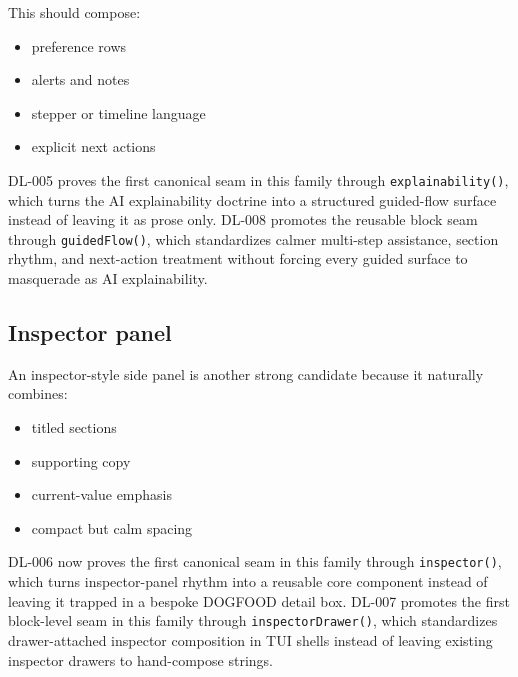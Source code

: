 This should compose:

\begin{itemize}
\tightlist
\item
  preference rows
\item
  alerts and notes
\item
  stepper or timeline language
\item
  explicit next actions
\end{itemize}

DL-005 proves the first canonical seam in this family through \texttt{e\allowbreak{}x\allowbreak{}p\allowbreak{}l\allowbreak{}a\allowbreak{}i\allowbreak{}n\allowbreak{}a\allowbreak{}b\allowbreak{}i\allowbreak{}l\allowbreak{}i\allowbreak{}t\allowbreak{}y\allowbreak{}(\allowbreak{})}, which turns the AI explainability doctrine into a structured guided-flow surface instead of leaving it as prose only. DL-008 promotes the reusable block seam through \texttt{g\allowbreak{}u\allowbreak{}i\allowbreak{}d\allowbreak{}e\allowbreak{}d\allowbreak{}F\allowbreak{}l\allowbreak{}o\allowbreak{}w\allowbreak{}(\allowbreak{})}, which standardizes calmer multi-step assistance, section rhythm, and next-action treatment without forcing every guided surface to masquerade as AI explainability.

\subsection{Inspector panel}\label{record-018-inspector-panel}

An inspector-style side panel is another strong candidate because it naturally combines:

\begin{itemize}
\tightlist
\item
  titled sections
\item
  supporting copy
\item
  current-value emphasis
\item
  compact but calm spacing
\end{itemize}

DL-006 now proves the first canonical seam in this family through \texttt{i\allowbreak{}n\allowbreak{}s\allowbreak{}p\allowbreak{}e\allowbreak{}c\allowbreak{}t\allowbreak{}o\allowbreak{}r\allowbreak{}(\allowbreak{})}, which turns inspector-panel rhythm into a reusable core component instead of leaving it trapped in a bespoke DOGFOOD detail box. DL-007 promotes the first block-level seam in this family through \texttt{i\allowbreak{}n\allowbreak{}s\allowbreak{}p\allowbreak{}e\allowbreak{}c\allowbreak{}t\allowbreak{}o\allowbreak{}r\allowbreak{}D\allowbreak{}r\allowbreak{}a\allowbreak{}w\allowbreak{}e\allowbreak{}r\allowbreak{}(\allowbreak{})}, which standardizes drawer-attached inspector composition in TUI shells instead of leaving existing inspector drawers to hand-compose strings.

